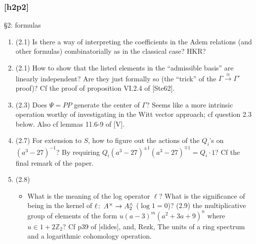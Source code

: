 \documentclass{rs}
\theoremstyle{definition}
\theoremstyle{remark}
\def\co{\colon\thinspace}
\newcommand{\mb}[1]{\mathbb{#1}}
\newcommand{\BZ}{{\mb Z}}
\newcommand{\md}{~~{\rm mod}~}
\renewcommand{\=}{\approx}
\renewcommand{\-}{\sim}
\numberwithin{equation}{section}
\numberwithin{thm}{section}
\begin{document}
\subsubsection{[h2p2]}

\S 2: formulas
\begin{enumerate}
 \item (2.1) Is there a way of interpreting the coefficients in the Adem relations (and other formulas) combinatorially as in the classical case? HKR?

 \item (2.1) How to show that the listed elements in the ``admissible basis'' are linearly independent? 
 Are they just formally so (the ``trick'' of the $\Gamma \stackrel{\cong}{\to} \Gamma'$ proof)? Cf the proof of proposition VI.2.4 of [Ste62].

 \item \label{center} (2.3) Does $\Psi = PP$ generate the center of $\Gamma$? 
 Seems like a more intrinsic operation worthy of investigating in the Witt vector approach; cf question 2.3 below. 
 Also cf lemmas 11.6-9 of [V].

 \item (2.7) For extension to $S$, how to figure out the actions of the $Q_i$'s on $(a^3 - 27)^{-1}$? 
 By requiring $Q_i (a^3 - 27)^{\pm 1} (a^3 - 27)^{\mp 1} = Q_i \cdot 1$? 
 Cf the final remark of the paper.

 \item \label{log} (2.8) 
 \begin{itemize}
 \label{repn}
% 
% 
% 
  \item What is the meaning of the log operator $\ell$? 
  What is the significance of being in the kernel of $\ell \co A^\times \to A^\wedge_2$ ($\log 1 = 0$)? 
  (2.9) the multiplicative group of elements of the form $u (a - 3)^m (a^2 + 3 a + 9)^n$ where $u \in 1 + 2 \BZ_2$?  
  Cf p39 of [slides], and, Rezk, The units of a ring spectrum and a logarithmic cohomology operation.


\end{itemize}
\end{enumerate}
\end{document}
